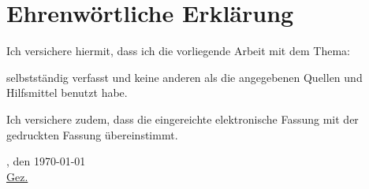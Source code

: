 \chapter*{Ehrenwörtliche Erklärung}

Ich versichere hiermit, dass ich die vorliegende Arbeit mit dem Thema: 

\begin{quote}
	\textit{\titel}
\end{quote} 

selbstständig
verfasst und keine anderen als die angegebenen Quellen und Hilfsmittel benutzt habe.

\vspace{0.25cm}

Ich versichere zudem, dass die eingereichte elektronische Fassung mit der gedruckten Fassung übereinstimmt.

\vspace{1cm}

\verfassungsort, den \today \\[0.5cm]
	{\underline{Gez. \autor}}
	{\makebox[6cm]{\hrulefill}}\\ 
\autorReverse
